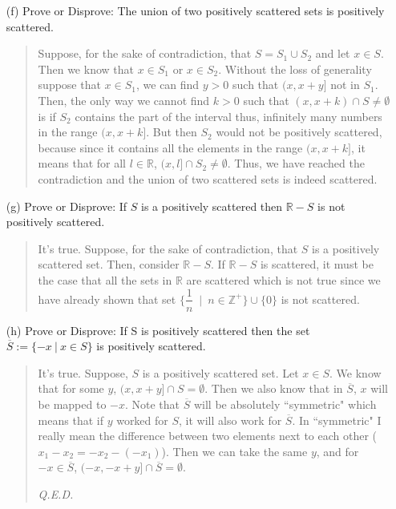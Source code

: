 \documentclass[12pt, a4paper]{article}                      %
\begin{document}
\begin{itemize}
\begin{itemize}
\item[]
\item[]

\item[(f)]
Prove or Disprove: The union of two positively scattered sets is positively scattered.
\begin{quote}
Suppose, for the sake of contradiction, that $S = S_1 \cup S_2$ and let $x \in S$. Then we know that $x \in S_1$ or $x \in S_2$.
Without the loss of generality suppose that $x \in S_1$, we can find $y > 0$ such that $(x, x + y]$ not in $S_1$. Then,
the only way we cannot find $k > 0$ such that $(x, x + k) \cap S \neq \emptyset$ is if $S_2$ contains the part of the interval
thus, infinitely many numbers in the range $(x, x + k]$. But then $S_2$ would not be positively scattered,
because since it contains all the elements in the range $(x, x + k]$, it means that for all $l \in \mathbb{R}$,
$(x, l] \cap S_2 \neq \emptyset$. Thus, we have reached the contradiction and the union of two scattered sets is indeed scattered.
\end{quote}

\item[]

\item[(g)]
Prove or Disprove: If $S$ is a positively scattered then $\mathbb{R} - S$ is not positively
scattered.
\begin{quote}
It's true. Suppose, for the sake of contradiction, that $S$ is a positively scattered set. Then, consider $\mathbb{R} - S$.
If $\mathbb{R} - S$ is scattered, it must be the case that all the sets in $\mathbb{R}$ are scattered which is not true
since we have already shown that set $\{\dfrac{1}{n} \ \mid \ n \in \mathbb{Z}^+ \} \cup \{0\}$ is not scattered.
\end{quote}

\item[]

\item[(h)]
Prove or Disprove: If S is positively scattered then the set $\overline{S} := \{-x \ | \ x \in S \}$ is positively scattered.
\begin{quote}
It's true. Suppose, $S$ is a positively scattered set. Let $x \in S$. We know that for some $y$, $(x, x + y] \cap S = \emptyset$.
Then we also know that in $\overline{S}$, $x$ will be mapped to $-x$. Note that $\overline{S}$ will be absolutely ``symmetric"
which means that if $y$ worked for $S$, it will also work for $\overline {S}$. In ``symmetric" I really mean the difference between
two elements next to each other ($x_1 - x_2 = -x_2 - (-x_1)$). Then we can take the same $y$, and for $-x \in \overline{S}$,
$(-x, -x + y] \cap \overline{S} = \emptyset$.
\begin{flushright}
\textit{Q.E.D.}
\end{flushright}
\end{quote}
\end{itemize}
\end{itemize} 
\end{document}
